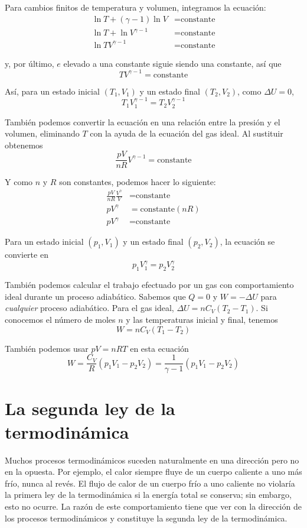 \documentclass[12pt]{article}
\begin{document}
  Para cambios finitos de temperatura y volumen, integramos la ecuación:
  \begin{align*}
    \ln{T} + (\gamma - 1)\ln{V} &= \text{constante}\\
    \ln{T} + \ln{V^{\gamma - 1}} &= \text{constante}\\
    \ln{TV^{\gamma - 1}} &= \text{constante}
  \end{align*}

  y, por último, $ e $ elevado a una constante siguie siendo una constante, así que
  \[
  TV^{\gamma - 1} = \text{constante}
  \]

  Así, para un estado inicial $ (T_{1}, V_{1}) $ y un estado final $ (T_{2}, V_{2}) $, como $ \Delta U = 0 $,
  \[
  T_{1}V_{1}^{\gamma - 1} = T_{2}V_{2}^{\gamma - 1} 
  \]

  También podemos convertir la ecuación en una relación entre la presión y el volumen, eliminando $ T $ con la ayuda de la ecuación del gas ideal. Al sustituir obtenemos
  \[
  \frac{pV}{nR}V^{\gamma - 1} = \text{constante}
  \]
  
  Y como $ n $ y $ R $ son constantes, podemos hacer lo siguiente:
  \begin{align*}
    \frac{pV}{nR}\frac{V^{\gamma}}{V} &= \text{constante}\\
    pV^{\gamma} &= \text{constante}(nR)\\
    pV^{\gamma} &= \text{constante}
  \end{align*}

  Para un estado inicial $ (p_{1}, V_{1}) $ y un estado final $ (p_{2}, V_{2}) $, la ecuación se convierte en 
  \[
  p_{1}V_{1}^{\gamma} = p_{2}V_{2}^{\gamma}
  \]

  También podemos calcular el trabajo efectuado por un gas con comportamiento ideal durante un proceso adiabático. Sabemos que $ Q = 0 $ y $ W = -\Delta U $ para \textit{cualquier} proceso adiabático. Para el gas ideal, $ \Delta U = nC_{V}(T_{2} - T_{1}) $. Si conocemos el número de moles $ n $ y las temperaturas inicial y final, tenemos 
  \[
    W = nC_{V}(T_{1}-T_{2})
  \]

  También podemos usar $ pV = nRT $ en esta ecuación
  \[
    W = \frac{C_{V}}{R}(p_{1}V_{1} - p_{2}V_{2}) = \frac{1}{\gamma - 1}(p_{1}V_{1} - p_{2}V_{2})
  \]

  \section{La segunda ley de la termodinámica}
  Muchos procesos termodinámicos suceden naturalmente en una dirección pero no en la opuesta. Por ejemplo, el calor siempre fluye de un cuerpo caliente a uno más frío, nunca al revés. El flujo de calor de un cuerpo frío a uno caliente no violaría la primera ley de la termodinámica si la energía total se conserva; sin embargo, esto no ocurre. La razón de este comportamiento tiene que ver con la dirección de los procesos termodinámicos y constituye la segunda ley de la termodinámica.
\end{document}
